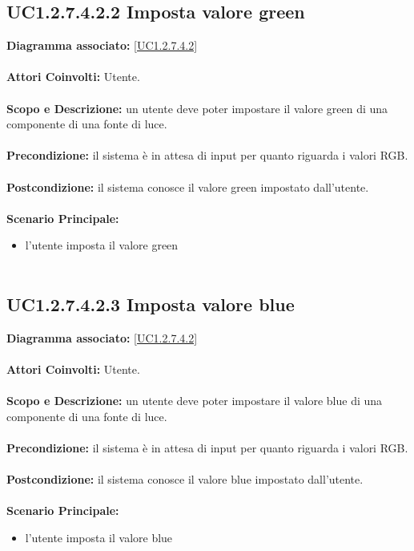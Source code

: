 \subsection{UC1.2.7.4.2.2 Imposta valore green}
\textbf{Diagramma associato:}
\ref{UC1.2.7.4.2} \\ \\
\textbf{Attori Coinvolti:}
Utente. \\ \\
\textbf{Scopo e Descrizione:}
un utente deve poter impostare il valore green di una componente di una fonte di luce. \\ \\
\textbf{Precondizione:}
il sistema è in attesa di input per quanto riguarda i valori RGB. \\ \\
\textbf{Postcondizione:}
il sistema conosce il valore green impostato dall'utente. \\ \\
\textbf{Scenario Principale:}
\begin{itemize}
\item l'utente imposta il valore green
\\ \\ \end{itemize}


\subsection{UC1.2.7.4.2.3 Imposta valore blue}
\textbf{Diagramma associato:}
\ref{UC1.2.7.4.2} \\ \\
\textbf{Attori Coinvolti:}
Utente. \\ \\
\textbf{Scopo e Descrizione:}
un utente deve poter impostare il valore blue di una componente di una fonte di luce. \\ \\
\textbf{Precondizione:}
il sistema è in attesa di input per quanto riguarda i valori RGB. \\ \\
\textbf{Postcondizione:}
il sistema conosce il valore blue impostato dall'utente. \\ \\
\textbf{Scenario Principale:}
\begin{itemize}
\item l'utente imposta il valore blue
\\ \\ \end{itemize}



